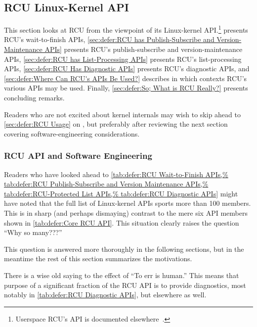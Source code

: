 
\subsection{RCU Linux-Kernel API}
\label{sec:defer:RCU Linux-Kernel API}

This section looks at RCU from the viewpoint of its Linux-kernel API\@.\footnote{
	Userspace RCU's API is documented
	elsewhere~\cite{PaulMcKenney2013LWNURCU}.}
presents RCU's wait-to-finish APIs,
\cref{sec:defer:RCU has Publish-Subscribe and Version-Maintenance APIs}
presents RCU's publish-subscribe and version-maintenance APIs,
\cref{sec:defer:RCU has List-Processing APIs}
presents RCU's list-processing APIs,
\cref{sec:defer:RCU Has Diagnostic APIs}
presents RCU's diagnostic APIs, and
\cref{sec:defer:Where Can RCU's APIs Be Used?}
describes in which contexts RCU's various APIs may be used.
Finally,
\cref{sec:defer:So; What is RCU Really?}
presents concluding remarks.

Readers who are not excited about kernel internals may wish to skip
ahead to \cref{sec:defer:RCU Usage}
on ,
but preferably after reviewing the next section covering software-engineering
considerations.

\subsubsection{RCU API and Software Engineering}
\label{sec:defer:RCU API and Software Engineering}

Readers who have looked ahead to
\cref{tab:defer:RCU Wait-to-Finish APIs,%
tab:defer:RCU Publish-Subscribe and Version Maintenance APIs,%
tab:defer:RCU-Protected List APIs,%
tab:defer:RCU Diagnostic APIs}
might have noted that the full list of Linux-kernel APIs sports more
than 100 members.
This is in sharp (and perhaps dismaying) contrast to the mere six
API members shown in
\cref{tab:defer:Core RCU API}.
This situation clearly raises the question ``Why so many???''

This question is answered more thoroughly in the following sections,
but in the meantime the rest of this section summarizes the motivations.

There is a wise old saying to the effect of ``To err is human.''
This means that purpose of a significant fraction of the RCU API is to
provide diagnostics, most notably in \cref{tab:defer:RCU Diagnostic APIs},
but elsewhere as well.

